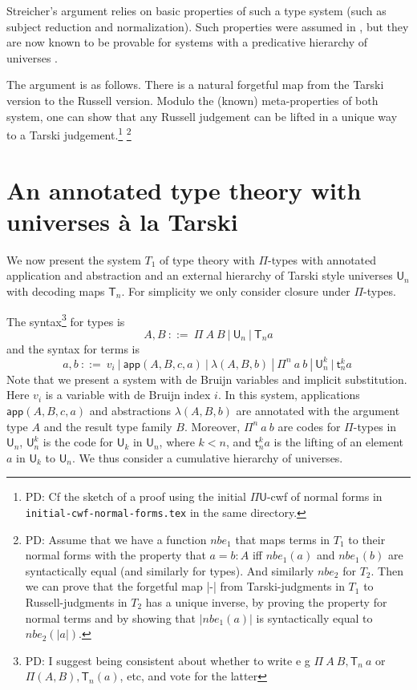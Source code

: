 \documentclass[11pt,a4paper]{article}
\theoremstyle{definition}
\def\UU{\mathsf{U}}
\newcommand{\LAM}{\lambda}
\newcommand{\APP}{\mathsf{app}}
\newcommand{\T}{\mathsf{T}}
\newcommand{\sT}{\mathsf{t}}
\begin{document}
Streicher's argument relies on  basic properties of such a type system (such as subject reduction and normalization). Such properties were assumed in \cite{Streicher:semtt}, but they are now known to be provable
for systems with a predicative hierarchy of universes \cite{coquand:sophia,abel:neworleans,abel:wroclaw,coq18}.

The argument is as follows. There is a natural forgetful map from the Tarski version to the Russell version. Modulo the (known) meta-properties of both system, one can show that any Russell judgement can be lifted in a unique way to a Tarski judgement.\footnote{PD: Cf the sketch of a proof using the initial $\Pi\UU$-cwf of normal forms in {\tt initial-cwf-normal-forms.tex} in the same directory.}
\footnote{PD: Assume that we have a function $nbe_1$ that maps terms in $T_1$ to their normal forms with the property that $a = b : A$ iff $nbe_1(a)$ and $nbe_1(b)$ are syntactically equal (and similarly for types). And similarly $nbe_2$ for $T_2$. Then we can prove that the forgetful map |-| from Tarski-judgments in $T_1$ to Russell-judgments in $T_2$ has a unique inverse, by proving the property for normal terms and by showing that $|nbe_1(a)|$ is syntactically equal to $nbe_2(|a|)$. }

\section{An annotated type theory with universes \`a la Tarski}

We now present the system $T_1$ of type theory with $\Pi$-types with annotated application and abstraction and an external hierarchy of Tarski style universes $\UU_n$ with decoding maps $\T_n$. For simplicity we only consider closure under $\Pi$-types. 

The syntax\footnote{PD: 
I suggest being consistent about whether to write e g $\Pi~A~B, \T_n~a$ 
or $\Pi(A,B),\T_n(a)$, etc, and vote for the latter
} 
for types is
$$
A,B~::=~\Pi~{A}~B~|~\UU_n~|~\T_n a
$$
and the syntax for terms is
$$
a,b~::=~v_i~|~\APP(A,B,c,a)~|~\LAM(A,B,b)~|~\Pi^n~ a~b~|~\UU^k_n~|~\sT^k_n a~
$$
Note that we present a system with de Bruijn variables and implicit substitution.
Here $v_i$ is a variable with de Bruijn index $i$. In this system, applications $\APP(A,B,c,a)$ and abstractions $\LAM(A,B,b)$ are annotated with the argument type $A$ and the result type family $B$. Moreover, $\Pi^n~ a~b$ are codes for $\Pi$-types in $\UU_n$, $\UU^k_n$ is the code for $\UU_k$ in $\UU_n$, where $k < n$, and $\sT^k_n a$ is the lifting of an element $a$ in $\UU_k$ to $\UU_n$. We thus consider a cumulative hierarchy of universes.
\end{document}
